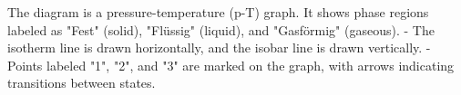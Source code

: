 The diagram is a pressure-temperature (p-T) graph. It shows phase regions labeled as "Fest" (solid), "Flüssig" (liquid), and "Gasförmig" (gaseous).  
- The isotherm line is drawn horizontally, and the isobar line is drawn vertically.  
- Points labeled "1", "2", and "3" are marked on the graph, with arrows indicating transitions between states.